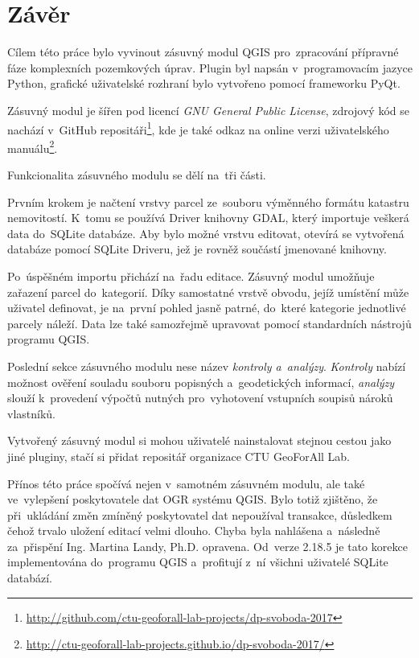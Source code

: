 \chapter{Závěr}
\label{zaver}

Cílem této práce bylo vyvinout zásuvný modul QGIS pro~zpracování
přípravné fáze komplexních pozemkových úprav. Plugin byl napsán
v~programovacím jazyce Python, grafické uživatelské rozhraní bylo
vytvořeno pomocí frameworku PyQt.

Zásuvný modul je šířen pod licencí \textit{GNU General Public
License}, zdrojový kód se nachází v~GitHub
repositáři\footnote{\url{http://github.com/ctu-geoforall-lab-projects/dp-svoboda-2017}},
kde je také odkaz na online verzi uživatelského
manuálu\footnote{\url{http://ctu-geoforall-lab-projects.github.io/dp-svoboda-2017/}}.

Funkcionalita zásuvného modulu se dělí na~tři části.

Prvním krokem je načtení vrstvy parcel ze~souboru výměnného formátu
katastru nemovitostí. K~tomu se používá  Driver knihovny GDAL,
který importuje veš\-kerá data do~SQLite databáze. Aby bylo možné
vrstvu editovat, otevírá se vytvořená databáze pomocí SQLite Driveru,
jež je rovněž součástí jmenované knihovny.

Po~úspěšném importu přichází na~řadu editace. Zásuvný modul umožňuje
zařazení parcel do~kategorií. Díky samostatné vrstvě obvodu, jejíž
umístění může uživatel definovat, je na~první pohled jasně patrné,
do~které kategorie jednotlivé parcely náleží. Data lze také samozřejmě
upravovat pomocí standardních nástrojů programu QGIS.

Poslední sekce zásuvného modulu nese název \textit{kontroly
a~analýzy}. \textit{Kontroly} nabízí možnost ověření souladu souboru
popisných a~geodetických informací, \textit{analýzy} slouží
k~provedení výpočtů nutných pro~vyhotovení vstupních soupisů nároků
vlastníků.

Vytvořený zásuvný modul si mohou uživatelé nainstalovat stejnou cestou
jako jiné pluginy, stačí si přidat repositář organizace CTU GeoForAll Lab.

Přínos této práce spočívá nejen v~samotném zásuvném modulu, ale také
ve~vylep\-šení poskytovatele dat OGR systému QGIS. Bylo totiž
zjištěno, že při~ukládání změn zmíněný poskytovatel dat nepoužíval
transakce, důsledkem čehož trvalo uložení editací velmi dlouho. Chyba
byla nahlášena a~následně za~přispění Ing. Martina Landy,
Ph.D. opravena. Od~verze 2.18.5 je tato korekce implementována
do~programu QGIS a~profitují z~ní všichni uživatelé SQLite databází.

